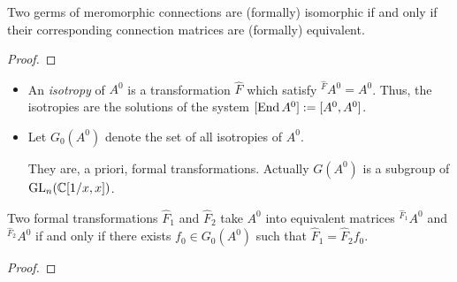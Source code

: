 \begin{prop}
  Two germs of meromorphic connections are (formally) isomorphic if and only if
  their corresponding connection matrices are (formally) equivalent.
\end{prop}
\begin{proof}
  \TODO{}
\end{proof}

\begin{defn}
  \begin{itemize}
    \item An \emph{isotropy} of $A^0$ is a transformation $\hat F$ which
      satisfy ${}^{\hat F}\!A^0=A^0$.
      Thus, the isotropies are the solutions of the system
      $[\operatorname{End} A^0]:=[A^0,A^0]$.
    \item Let $G_0(A^0)$ denote the set of all isotropies of $A^0$.
      \begin{s-rem}
        They are, a priori, formal transformations. Actually $G(A^0)$ is a
        subgroup of $\operatorname{GL}_n(\mathbb{C}[1/x,x])$.
      \end{s-rem}
      \begin{comment}
        In the nice case this is only $T$?
      \end{comment}
  \end{itemize}
\end{defn}
\begin{lem}
  Two formal transformations $\hat F_1$ and $\hat F_2$ take $A^0$ into
  equivalent matrices ${}^{\hat F_1}\!A^0$ and  ${}^{\hat F_2}\!A^0$ if and
  only if there exists $f_0\in G_0(A^0)$ such that $\hat F_1=\hat F_2f_0$.
\end{lem}
\begin{proof}
  \TODO{}
\end{proof}

